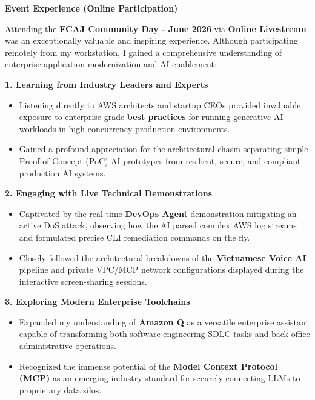 \vspace{0.5em}\noindent\textbf{Event Experience (Online Participation)}

Attending the \textbf{FCAJ Community Day - June 2026} via \textbf{Online
Livestream} was an exceptionally valuable and inspiring experience.
Although participating remotely from my workstation, I gained a
comprehensive understanding of enterprise application modernization and
AI enablement:

\vspace{0.5em}\noindent\textbf{1. Learning from Industry Leaders and Experts}

\begin{itemize}
\tightlist
\item
  Listening directly to AWS architects and startup CEOs provided
  invaluable exposure to enterprise-grade \textbf{best practices} for
  running generative AI workloads in high-concurrency production
  environments.
\item
  Gained a profound appreciation for the architectural chasm separating
  simple Proof-of-Concept (PoC) AI prototypes from resilient, secure,
  and compliant production AI systems.
\end{itemize}

\vspace{0.5em}\noindent\textbf{2. Engaging with Live Technical Demonstrations}

\begin{itemize}
\tightlist
\item
  Captivated by the real-time \textbf{DevOps Agent} demonstration
  mitigating an active DoS attack, observing how the AI parsed complex
  AWS log streams and formulated precise CLI remediation commands on the
  fly.
\item
  Closely followed the architectural breakdowns of the
  \textbf{Vietnamese Voice AI} pipeline and private VPC/MCP network
  configurations displayed during the interactive screen-sharing
  sessions.
\end{itemize}

\vspace{0.5em}\noindent\textbf{3. Exploring Modern Enterprise Toolchains}

\begin{itemize}
\tightlist
\item
  Expanded my understanding of \textbf{Amazon Q} as a versatile
  enterprise assistant capable of transforming both software engineering
  SDLC tasks and back-office administrative operations.
\item
  Recognized the immense potential of the \textbf{Model Context Protocol
  (MCP)} as an emerging industry standard for securely connecting LLMs
  to proprietary data silos.
\end{itemize}

